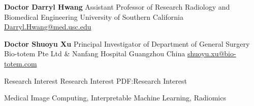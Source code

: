 \documentclass[letterpaper,MMMyyyy,nonstopmode]{simpleresumecv}
\begin{document}
\begin{Body}
\BigGap
\BulletItem
\textbf{Doctor Darryl Hwang}
\newline
Assistant Professor of Research Radiology and Biomedical Engineering
\newline
University of Southern California
\newline
\href{mailto:Darryl.Hwang@med.usc.edu}
{Darryl.Hwang@med.usc.edu}

\BigGap
\BulletItem
\textbf{Doctor Shuoyu Xu}
\newline
Principal Investigator of Department of General Surgery
\newline
Bio-totem Pte Ltd \& Nanfang Hospital Guangzhou China
\newline
\href{mailto:shuoyu.xu@bio-totem.com}
{shuoyu.xu@bio-totem.com}

\Section
{Research Interest}
{Research Interest}
{PDF:Research Interest}

Medical Image Computing,
Interpretable Machine Learning,
Radiomics







\end{Body}
\end{document}

